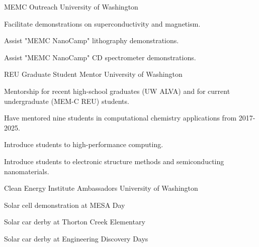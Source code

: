 

\begin{cventries}

\cventry
  {}
  {MEMC Outreach} %
  {University of Washington} %
  {}
  {
    \begin{cvitems}
      \item{Facilitate demonstrations on superconductivity and magnetism.}
      \item{Assist "MEMC NanoCamp" lithography demonstrations.}
      \item{Assist "MEMC NanoCamp" CD spectrometer demonstrations.}
    \end{cvitems}
  }

\cventry
  {}
  {REU Graduate Student Mentor} %
  {University of Washington} %
  {}
  {
    \begin{cvitems}
      \item{Mentorship for recent high-school graduates (UW ALVA) and for current undergraduate (MEM-C REU) students.}
      \item{Have mentored nine students in computational chemistry applications from 2017-2025.}
      \item{Introduce students to high-performance computing.}
      \item{Introduce students to electronic structure methods and semiconducting nanomaterials.}
    \end{cvitems}
  }

\cventry
  {}
  {Clean Energy Institute Ambassadors} %
  {University of Washington} %
  {}
  {
    \begin{cvitems}
      \item{Solar cell demonstration at MESA Day}
      \item{Solar car derby at Thorton Creek Elementary}
      \item{Solar car derby at Engineering Discovery Days}
    \end{cvitems}
  }


\end{cventries}
